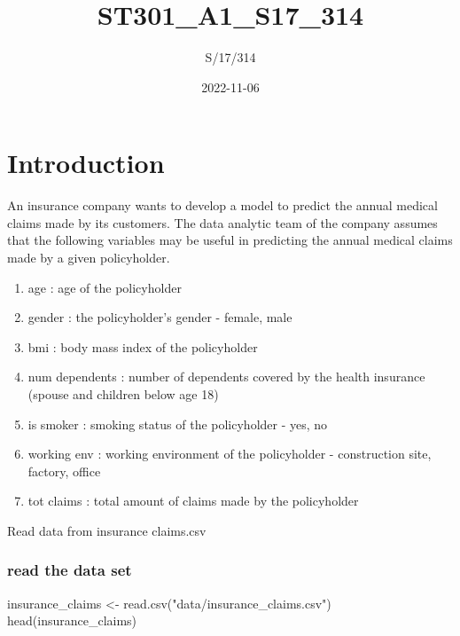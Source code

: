 \documentclass[
]{article}
\title{ST301\_A1\_S17\_314}
\author{S/17/314}
\date{2022-11-06}
\newenvironment{Shaded}{\begin{snugshade}}{\end{snugshade}}
\newcommand{\FunctionTok}[1]{\textcolor[rgb]{0.00,0.00,0.00}{#1}}
\newcommand{\NormalTok}[1]{#1}
\newcommand{\OtherTok}[1]{\textcolor[rgb]{0.56,0.35,0.01}{#1}}
\newcommand{\StringTok}[1]{\textcolor[rgb]{0.31,0.60,0.02}{#1}}
\providecommand{\tightlist}{%
  \setlength{\itemsep}{0pt}\setlength{\parskip}{0pt}}
\begin{document}
\maketitle

\hypertarget{introduction}{%
\section{Introduction}\label{introduction}}

An insurance company wants to develop a model to predict the annual
medical claims made by its customers. The data analytic team of the
company assumes that the following variables may be useful in predicting
the annual medical claims made by a given policyholder.

\begin{enumerate}
\def\labelenumi{\arabic{enumi}.}
\tightlist
\item
  age : age of the policyholder
\item
  gender : the policyholder's gender - female, male
\item
  bmi : body mass index of the policyholder
\item
  num dependents : number of dependents covered by the health insurance
  (spouse and children below age 18)
\item
  is smoker : smoking status of the policyholder - yes, no
\item
  working env : working environment of the policyholder - construction
  site, factory, office
\item
  tot claims : total amount of claims made by the policyholder
\end{enumerate}

Read data from insurance claims.csv

\hypertarget{read-the-data-set}{%
\subsubsection{read the data set}\label{read-the-data-set}}

\begin{Shaded}
\begin{Highlighting}[]
\NormalTok{insurance\_claims }\OtherTok{\textless{}{-}} \FunctionTok{read.csv}\NormalTok{(}\StringTok{"data/insurance\_claims.csv"}\NormalTok{)}
\FunctionTok{head}\NormalTok{(insurance\_claims)}
\end{Highlighting}
\end{Shaded}
\end{document}

